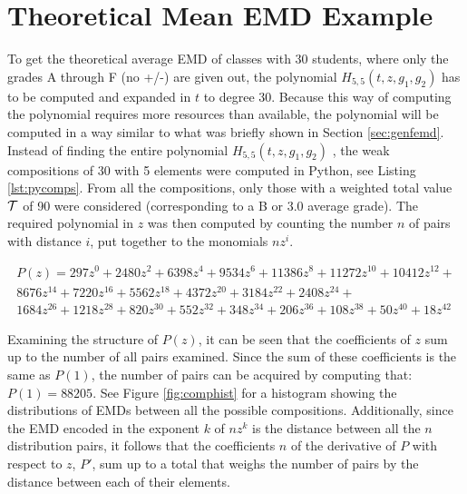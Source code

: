 \documentclass[12pt,letterpaper,oneside,openany]{book}
\begin{document}
\section{Theoretical Mean EMD Example}

To get the theoretical average EMD of classes with 30 students, where only the grades A through F  (no +/-) are given out, the polynomial $H_{5,5}(t, z, g_1, g_2)$ has to be computed and expanded in $t$ to degree 30. Because this way of computing the polynomial requires more resources than available, the polynomial will be computed in a way similar to what was briefly shown in Section \ref{sec:genfemd}.
Instead of finding the entire polynomial $H_{5,5}(t, z, g_1, g_2)$ , the weak compositions of 30 with 5 elements were computed in Python, see Listing \ref{lst:pycomps}. From all the compositions, only those with a weighted total value ${\mathcal{T}}$ of 90 were considered (corresponding to a B or 3.0 average grade). The required polynomial in $z$ was then computed by counting the number $n$ of pairs with distance $i$, put together to the monomials $nz^i$.


\begin{multline*}
	P(z)=297z^{0}+2480z^{2}+6398z^{4}+9534z^{6}+11386z^{8}+11272z^{10}+10412z^{12}+\\8676z^{14}+7220z^{16}+5562z^{18}+4372z^{20}+3184z^{22}+2408z^{24}+\\1684z^{26}+1218z^{28}+820z^{30}+552z^{32}+348z^{34}+206z^{36}+108z^{38}+50z^{40}+18z^{42}
\end{multline*}

Examining the structure of $P(z)$, it can be seen that the coefficients of  $z$ sum up to the number of all pairs examined. Since the sum of these coefficients is the same as $P(1)$, the number of pairs can be acquired by computing that: $P(1)=88205$. See Figure \ref{fig:comphist} for a histogram showing the distributions of EMDs between all the possible compositions.
Additionally, since the EMD encoded in the exponent $k$ of $nz^k$ is the distance between all the $n$ distribution pairs, it follows that the coefficients $n$ of the derivative of $P$ with respect to $z$, $P'$, sum up to a total that weighs the number of pairs by the distance between each of their elements.
\end{document}
